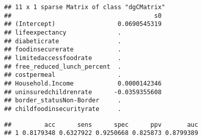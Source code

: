 \documentclass[]{article}
\newenvironment{Shaded}{\begin{snugshade}}{\end{snugshade}}
\newcommand{\CommentTok}[1]{\textcolor[rgb]{0.56,0.35,0.01}{\textit{#1}}}
\newcommand{\ControlFlowTok}[1]{\textcolor[rgb]{0.13,0.29,0.53}{\textbf{#1}}}
\newcommand{\DataTypeTok}[1]{\textcolor[rgb]{0.13,0.29,0.53}{#1}}
\newcommand{\DecValTok}[1]{\textcolor[rgb]{0.00,0.00,0.81}{#1}}
\newcommand{\KeywordTok}[1]{\textcolor[rgb]{0.13,0.29,0.53}{\textbf{#1}}}
\newcommand{\NormalTok}[1]{#1}
\newcommand{\OperatorTok}[1]{\textcolor[rgb]{0.81,0.36,0.00}{\textbf{#1}}}
\newcommand{\OtherTok}[1]{\textcolor[rgb]{0.56,0.35,0.01}{#1}}
\newcommand{\StringTok}[1]{\textcolor[rgb]{0.31,0.60,0.02}{#1}}
\begin{document}
\begin{verbatim}
## 11 x 1 sparse Matrix of class "dgCMatrix"
##                                       s0
## (Intercept)                 0.0690545319
## lifeexpectancy              .           
## diabeticrate                .           
## foodinsecurerate            .           
## limitedaccessfoodrate       .           
## free_reduced_lunch_percent  .           
## costpermeal                 .           
## Household.Income            0.0000142346
## uninsuredchildrenrate      -0.0359355608
## border_statusNon-Border     .           
## childfoodinsecurityrate     .
\end{verbatim}

\begin{Shaded}
\end{Shaded}

\begin{verbatim}
##         acc      sens      spec      ppv       auc
## 1 0.8179348 0.6327922 0.9250668 0.825873 0.8799389
\end{verbatim}
\end{document}
